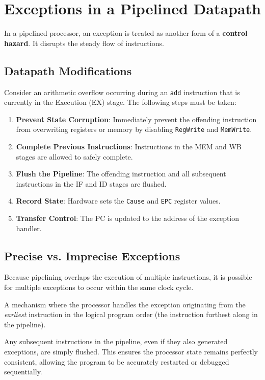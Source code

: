 \section{Exceptions in a Pipelined Datapath}
In a pipelined processor, an exception is treated as another form of a \textbf{control hazard}. It disrupts the steady flow of instructions.

\subsection{Datapath Modifications}
\begin{remark}
Consider an arithmetic overflow occurring during an \texttt{add} instruction that is currently in the Execution (EX) stage. The following steps must be taken:
\begin{enumerate}
    \item \textbf{Prevent State Corruption}: Immediately prevent the offending instruction from overwriting registers or memory by disabling \texttt{RegWrite} and \texttt{MemWrite}.
    \item \textbf{Complete Previous Instructions}: Instructions in the MEM and WB stages are allowed to safely complete.
    \item \textbf{Flush the Pipeline}: The offending instruction and all subsequent instructions in the IF and ID stages are flushed.
    \item \textbf{Record State}: Hardware sets the \texttt{Cause} and \texttt{EPC} register values.
    \item \textbf{Transfer Control}: The PC is updated to the address of the exception handler.
\end{enumerate}
\end{remark}

\subsection{Precise vs. Imprecise Exceptions}
Because pipelining overlaps the execution of multiple instructions, it is possible for multiple exceptions to occur within the same clock cycle.

\begin{definition}
A mechanism where the processor handles the exception originating from the \textit{earliest} instruction in the logical program order (the instruction furthest along in the pipeline).
\end{definition}

\begin{proposition}
Any subsequent instructions in the pipeline, even if they also generated exceptions, are simply flushed. This ensures the processor state remains perfectly consistent, allowing the program to be accurately restarted or debugged sequentially.
\end{proposition}
